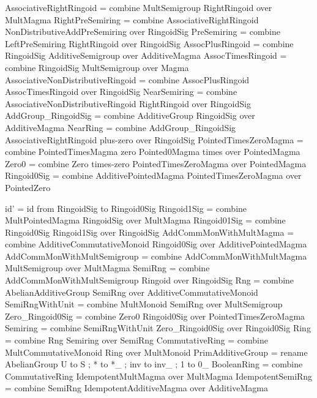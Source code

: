 \begin{togcode} 
AssociativeRightRingoid = 
  combine MultSemigroup {} RightRingoid {} over MultMagma 
RightPreSemiring = 
  combine AssociativeRightRingoid {} NonDistributiveAddPreSemiring {} 
  over RingoidSig 
PreSemiring = combine LeftPreSemiring {} RightRingoid {} over RingoidSig
AssocPlusRingoid  = 
  combine RingoidSig {} AdditiveSemigroup {} over AdditiveMagma
AssocTimesRingoid = combine RingoidSig {} MultSemigroup {} over Magma
AssociativeNonDistributiveRingoid = 
  combine AssocPlusRingoid {} AssocTimesRingoid {} over RingoidSig 
NearSemiring  = 
  combine AssociativeNonDistributiveRingoid {} RightRingoid {} 
  over RingoidSig
AddGroup_RingoidSig = 
  combine AdditiveGroup {} RingoidSig {} over AdditiveMagma 
NearRing = 
  combine AddGroup_RingoidSig {} AssociativeRightRingoid plus-zero 
  over RingoidSig
PointedTimesZeroMagma = 
  combine PointedTimesMagma zero Pointed0Magma times over PointedMagma 
Zero0 = combine Zero times-zero PointedTimesZeroMagma {} over PointedMagma 
Ringoid0Sig = 
  combine AdditivePointedMagma {} PointedTimesZeroMagma {} 
  over PointedZero
\end{togcode} 

\begin{togcode} 
id' = id from RingoidSig to Ringoid0Sig 
Ringoid1Sig = combine MultPointedMagma {} RingoidSig {} over MultMagma
Ringoid01Sig = combine Ringoid0Sig {} Ringoid1Sig {} over RingoidSig
AddCommMonWithMultMagma = 
  combine AdditiveCommutativeMonoid {} Ringoid0Sig {} 
  over AdditivePointedMagma
AddCommMonWithMultSemigroup = 
  combine AddCommMonWithMultMagma {} MultSemigroup {} over MultMagma
SemiRng = 
  combine AddCommMonWithMultSemigroup {} Ringoid {} over RingoidSig
Rng = 
  combine AbelianAdditiveGroup {} SemiRng {} over AdditiveCommutativeMonoid 
SemiRngWithUnit = combine MultMonoid {} SemiRng {} over MultSemigroup 
Zero_Ringoid0Sig = 
  combine Zero0 {} Ringoid0Sig {} over PointedTimesZeroMagma
Semiring = combine SemiRngWithUnit {} Zero_Ringoid0Sig {} over Ringoid0Sig 
Ring = combine Rng {} Semiring {} over SemiRng 
CommutativeRing = combine MultCommutativeMonoid {} Ring {} over MultMonoid
PrimAdditiveGroup = 
  rename AbelianGroup {U to S ; * to *_ ; inv to inv_ ; 1 to 0_}
BooleanRing = 
  combine CommutativeRing {} IdempotentMultMagma {} over MultMagma 
IdempotentSemiRng = 
  combine SemiRng {} IdempotentAdditiveMagma {} over AdditiveMagma
\end{togcode} 

